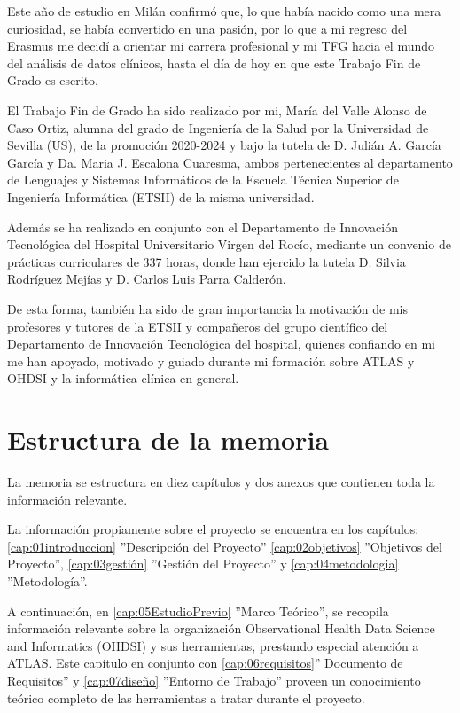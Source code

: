 Este año de estudio en Milán confirmó que, lo que había nacido como una mera curiosidad, se había convertido en una pasión, por lo que a mi regreso del Erasmus me decidí a orientar mi carrera profesional y mi TFG hacia el mundo del análisis de datos clínicos, hasta el día de hoy en que este Trabajo Fin de Grado es escrito.

El Trabajo Fin de Grado ha sido realizado por mi, María del Valle Alonso de Caso Ortiz, alumna del grado de Ingeniería de la Salud por la Universidad de Sevilla (US), de la promoción 2020-2024 y bajo la tutela de D. Julián A. García García y Da. Maria J. Escalona Cuaresma, ambos pertenecientes al departamento de Lenguajes y Sistemas Informáticos de la Escuela Técnica Superior de Ingeniería Informática (ETSII) de la misma universidad. 

Además se ha realizado en conjunto con el Departamento de Innovación Tecnológica del Hospital Universitario Virgen del Rocío, mediante un convenio de prácticas curriculares de 337 horas, donde han ejercido la tutela D. Silvia Rodríguez Mejías y D. Carlos Luis Parra Calderón. 

De esta forma, también ha sido de gran importancia la motivación de mis profesores y tutores de la ETSII y compañeros del grupo científico del Departamento de Innovación Tecnológica del hospital, quienes confiando en mi me han apoyado, motivado y guiado durante mi formación sobre ATLAS y OHDSI y la informática clínica en general.

\section{Estructura de la memoria} \label{sec:01estructura}

La memoria se estructura en diez capítulos y dos anexos que contienen toda la información relevante.

La información propiamente sobre el proyecto se encuentra en los capítulos: \ref{cap:01introduccion} ''Descripción del Proyecto'' \ref{cap:02objetivos} ''Objetivos del Proyecto'', \ref{cap:03gestión} ''Gestión del Proyecto'' y \ref{cap:04metodologia} ''Metodología''.

A continuación, en \ref{cap:05EstudioPrevio} ''Marco Teórico'', se recopila información relevante sobre la organización Observational Health Data Science and Informatics (OHDSI) y sus herramientas, prestando especial atención a ATLAS. Este capítulo en conjunto con \ref{cap:06requisitos}'' Documento de Requisitos'' y \ref{cap:07diseño} ''Entorno de Trabajo'' proveen un conocimiento teórico completo de las herramientas a tratar durante el proyecto. 

